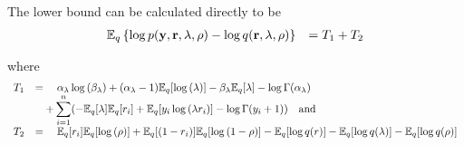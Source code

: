 \documentclass{amsart}[12pt]
\begin{document}
The lower bound can be calculated directly to be
\[
	\begin{array}{rl}
		\mathbb{E}_q \left\{ \log{p({\bf y}, {\bf r}, \lambda, \rho)} - \log{q({\bf r}, \lambda, \rho)} \right\} & = T_1 + T_2 \\
	\end{array}
\]

\noindent where
\[
	\begin{array}{rl}
		T_1 & \displaystyle =                                                                                                                          
		\quad \alpha_\lambda \log{(\beta_\lambda)} + (\alpha_\lambda - 1) {\mathbb E}_q[\log{(\lambda)}] - \beta_\lambda {\mathbb E}_q [\lambda] - \log\Gamma(\alpha_\lambda) \\
		    & \displaystyle \quad + \sum_{i=1}^n ( -{\mathbb E}_q [\lambda] {\mathbb E}_q [r_i] + {\mathbb E}_q[y_i \log{(\lambda r_i)}] - \log\Gamma(y_i+1)) \quad \mbox{and} 
		\\ [1ex]
		T_2 & = \quad \mathbb{E}_q[r_i] {\mathbb E}_q[\log{(\rho)}] + {\mathbb E}_q[(1 - r_i)] {\mathbb E}_q[\log{(1 - \rho)}]                                                     
		- {\mathbb E}_q[\log{q(r)}] 
		- {\mathbb E}_q[\log{q(\lambda)}] 
		- {\mathbb E}_q[ \log{q(\rho)}]
	\end{array}
\]
\end{document}
